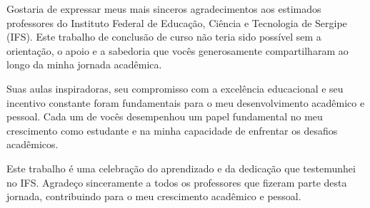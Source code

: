\documentclass[
	12pt,				%
	oneside,			%
	a4paper,			%
	english,			%
	french,				%
	spanish,			%
	brazil				%
	]{abntex2}
\begin{document}

\frenchspacing


\imprimircapa



\imprimirfolhaderosto





\begin{agradecimentos}

Gostaria de expressar meus mais sinceros agradecimentos aos estimados
professores do Instituto Federal de Educação, Ciência e Tecnologia de
Sergipe (IFS). Este trabalho de conclusão de curso não teria sido
possível sem a orientação, o apoio e a sabedoria que vocês generosamente
compartilharam ao longo da minha jornada acadêmica.

Suas aulas inspiradoras, seu compromisso com a excelência educacional e
seu incentivo constante foram fundamentais para o meu desenvolvimento
acadêmico e pessoal. Cada um de vocês desempenhou um papel fundamental
no meu crescimento como estudante e na minha capacidade de enfrentar os
desafios acadêmicos.

Este trabalho é uma celebração do aprendizado e da dedicação que
testemunhei no IFS. Agradeço sinceramente a todos os professores que
fizeram parte desta jornada, contribuindo para o meu crescimento
acadêmico e pessoal.

\end{agradecimentos}

\end{document}
